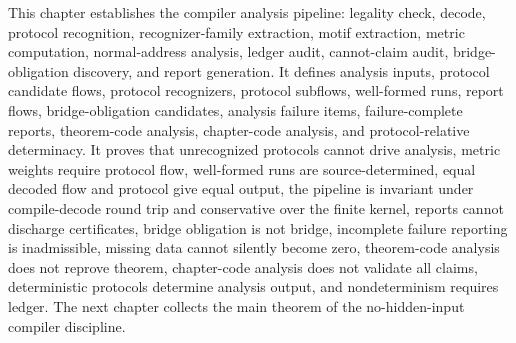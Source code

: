 \begin{remark}[Outlook]
\label{rem:analysis-pipeline-outlook}
This chapter establishes the compiler analysis pipeline: legality check, decode, protocol recognition, recognizer-family extraction, motif extraction, metric computation, normal-address analysis, ledger audit, cannot-claim audit, bridge-obligation discovery, and report generation. It defines analysis inputs, protocol candidate flows, protocol recognizers, protocol subflows, well-formed runs, report flows, bridge-obligation candidates, analysis failure items, failure-complete reports, theorem-code analysis, chapter-code analysis, and protocol-relative determinacy. It proves that unrecognized protocols cannot drive analysis, metric weights require protocol flow, well-formed runs are source-determined, equal decoded flow and protocol give equal output, the pipeline is invariant under compile-decode round trip and conservative over the finite kernel, reports cannot discharge certificates, bridge obligation is not bridge, incomplete failure reporting is inadmissible, missing data cannot silently become zero, theorem-code analysis does not reprove theorem, chapter-code analysis does not validate all claims, deterministic protocols determine analysis output, and nondeterminism requires ledger. The next chapter collects the main theorem of the no-hidden-input compiler discipline.
\end{remark}
